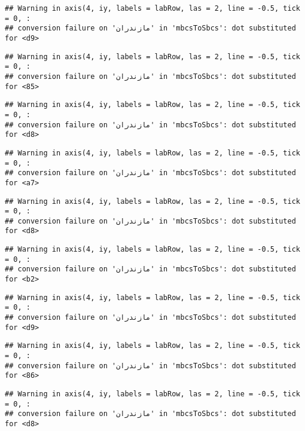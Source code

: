 \documentclass[
]{article}
\begin{document}
\begin{verbatim}
## Warning in axis(4, iy, labels = labRow, las = 2, line = -0.5, tick = 0, :
## conversion failure on 'مازندران' in 'mbcsToSbcs': dot substituted for <d9>
\end{verbatim}

\begin{verbatim}
## Warning in axis(4, iy, labels = labRow, las = 2, line = -0.5, tick = 0, :
## conversion failure on 'مازندران' in 'mbcsToSbcs': dot substituted for <85>
\end{verbatim}

\begin{verbatim}
## Warning in axis(4, iy, labels = labRow, las = 2, line = -0.5, tick = 0, :
## conversion failure on 'مازندران' in 'mbcsToSbcs': dot substituted for <d8>
\end{verbatim}

\begin{verbatim}
## Warning in axis(4, iy, labels = labRow, las = 2, line = -0.5, tick = 0, :
## conversion failure on 'مازندران' in 'mbcsToSbcs': dot substituted for <a7>
\end{verbatim}

\begin{verbatim}
## Warning in axis(4, iy, labels = labRow, las = 2, line = -0.5, tick = 0, :
## conversion failure on 'مازندران' in 'mbcsToSbcs': dot substituted for <d8>
\end{verbatim}

\begin{verbatim}
## Warning in axis(4, iy, labels = labRow, las = 2, line = -0.5, tick = 0, :
## conversion failure on 'مازندران' in 'mbcsToSbcs': dot substituted for <b2>
\end{verbatim}

\begin{verbatim}
## Warning in axis(4, iy, labels = labRow, las = 2, line = -0.5, tick = 0, :
## conversion failure on 'مازندران' in 'mbcsToSbcs': dot substituted for <d9>
\end{verbatim}

\begin{verbatim}
## Warning in axis(4, iy, labels = labRow, las = 2, line = -0.5, tick = 0, :
## conversion failure on 'مازندران' in 'mbcsToSbcs': dot substituted for <86>
\end{verbatim}

\begin{verbatim}
## Warning in axis(4, iy, labels = labRow, las = 2, line = -0.5, tick = 0, :
## conversion failure on 'مازندران' in 'mbcsToSbcs': dot substituted for <d8>
\end{verbatim}
\end{document}
